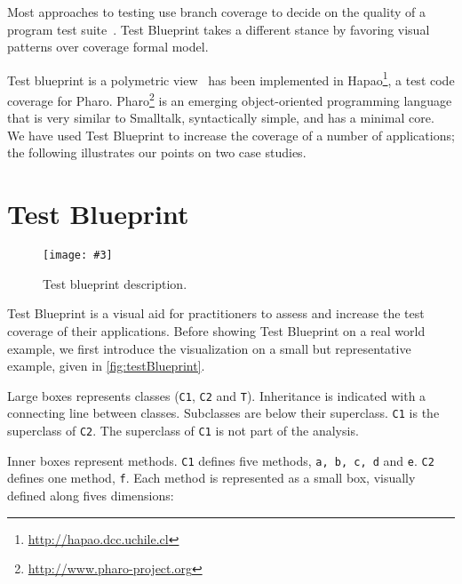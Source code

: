 \documentclass{sig-alternate}
\newcommand{\ct}{\lstinline[backgroundcolor=\color{white},basicstyle=\footnotesize\ttfamily]}
\newcommand{\fig}[4]{
	\begin{figure}[#1]
		\centering
		\texttt{[image: \#3]}
		\caption{\label{fig:#3}#4}
	\end{figure}}
\newcommand{\seclabel}[1]{\label{sec:#1}}
\newcommand{\hapao}{Hapao\xspace}
\begin{document}
Most approaches to testing use branch coverage to decide on the quality of a program test suite~\cite{Hong97a}.
Test Blueprint takes a different stance by favoring visual patterns over coverage formal model. 

Test blueprint is a polymetric view~\cite{Lanz03d,Berg10c} has been implemented in \hapao\footnote{\url{http://hapao.dcc.uchile.cl}}, a test code coverage for Pharo. Pharo\footnote{\url{http://www.pharo-project.org}} is an emerging object-oriented programming language that is very similar to Smalltalk, syntactically simple, and has a minimal core. We have used Test Blueprint to increase the coverage of a number of applications; the following illustrates our points on two case studies.


\section{Test Blueprint}\seclabel{testblueprint}


\fig{}{0.5}{testBlueprint}{Test blueprint description.}

Test Blueprint is a visual aid for practitioners to assess and increase the test coverage of their applications. 
Before showing Test Blueprint on a real world example, we first introduce the visualization on a small but representative example, given in \autoref{fig:testBlueprint}.

Large boxes represents classes (\ct{C1}, \ct{C2} and \ct{T}). Inheritance is indicated with a connecting line between classes. Subclasses are below their superclass. \ct{C1} is the superclass of \ct{C2}. The superclass of \ct{C1} is not part of the analysis. 

Inner boxes represent methods. \ct{C1} defines five methods, \ct{a, b, c, d} and \ct{e}. \ct{C2} defines one method, \ct{f}. Each method is represented as a small box, visually defined along fives dimensions:
\end{document}
